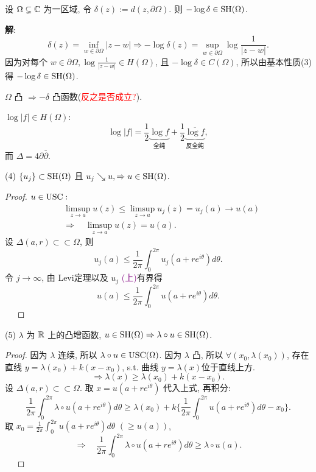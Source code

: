 \begin{example}\label{ex2.2}
  设 $\Omega \subsetneq {\mathbb C}$ 为一区域, 令 $\delta (z):=d(z, \partial \Omega )$. 则 $-\log \delta  \in \operatorname{SH} (\Omega )$.
  
  \textbf{解}: $$\delta (z)=\inf_{w \in \partial \Omega }|z-w| \Rightarrow -\log \delta (z)=\sup_{w \in \partial \Omega }\log \frac{1}{|z-w|}.$$
  因为对每个 $w \in \partial \Omega , \log \frac{1}{|z-w|} \in H(\Omega )$, 且 $-\log \delta \in C(\Omega )$, 所以由基本性质(3) 得   $-\log \delta  \in \operatorname{SH} (\Omega )$.
\end{example}
\begin{remark}
  $\Omega $ 凸 $\Rightarrow -\delta $ 凸函数(\textcolor{red}{反之是否成立?}).    
\end{remark}
\begin{remark}
  $\log |f| \in H(\Omega )$: 
  $$ \log|f|=\frac{1}{2}\underbrace{\log f}_{\text{全纯}} + \frac{1}{2}\underbrace{\overline{\log f}}_{\text{反全纯}} ,$$
  而 $\Delta =4 \partial \bar \partial $. 
\end{remark}


\noindent (4)
$\{u_j\} \subset \operatorname{SH} (\Omega )$ 且 $u_j \searrow u, \Rightarrow u \in \operatorname{SH}(\Omega )$.
  \begin{proof}
    $u \in \operatorname{USC}:$
    $$ \begin{aligned}
     & \limsup _{z \to a} u(z) \leq \limsup _{z \to a} u_j(z )=u_j(a) \to u(a)\\
     & \Rightarrow \quad \limsup _{z \to a} u(z)=u(a) .
    \end{aligned}  $$ 
    设 $\Delta (a,r) \subset \subset \Omega $, 则 
    $$ u_j(a) \leq \frac{1}{2 \pi }\int_{0}^{2 \pi } u_j(a+r e^{i \theta }) d \theta  .$$ 
    令 $j \to \infty $, 由 Levi定理以及 $u_j$ \textcolor{purple}{(上)}有界得 
    $$ u(a) \leq \frac{1}{2 \pi }\int_{0}^{2 \pi } u(a+r e^{i \theta }) d \theta  .$$ 
    ~~
  \end{proof}

\noindent (5) $\lambda$ 为 ${\mathbb R}$ 上的凸增函数, $u \in \operatorname{SH}(\Omega ) \Rightarrow \lambda \circ u \in \operatorname{SH}(\Omega )$.  
\begin{proof}
  因为 $\lambda $ 连续, 所以 $\lambda \circ u \in \operatorname{USC}(\Omega )$.   因为 $\lambda $ 凸, 所以 $\forall (x_0,\lambda (x_0))$, 存在直线 $y=\lambda (x_0)+k(x-x_0)$, s.t. 曲线 $y=\lambda (x)$位于直线上方. 
  $$ \Rightarrow \lambda (x) \geq \lambda (x_0)+k(x-x_0) .$$
  设 $\Delta (a,r) \subset \subset \Omega $. 取 $x=u(a+r e^{i \theta })$ 代入上式, 再积分: 
  $$ \frac{1}{2 \pi }\int_{0}^{2 \pi } \lambda \circ u(a+r e^{i \theta }) d \theta  \geq \lambda (x_0)+ k \big\{\frac{1}{2 \pi } \int_{0}^{2 \pi } u(a+r e^{i \theta }) d \theta -x_0 \big\} .$$      
  取 $x_0= \frac{1}{2 \pi } \int_{0}^{2 \pi } u(a+r e^{i \theta }) d \theta $ $(\geq u(a))$, 
  $$ \Rightarrow \quad  \frac{1}{2 \pi }\int_{0}^{2 \pi } \lambda \circ u(a+r e^{i \theta }) d \theta \geq \lambda \circ u(a).$$ 
  ~~
\end{proof}


